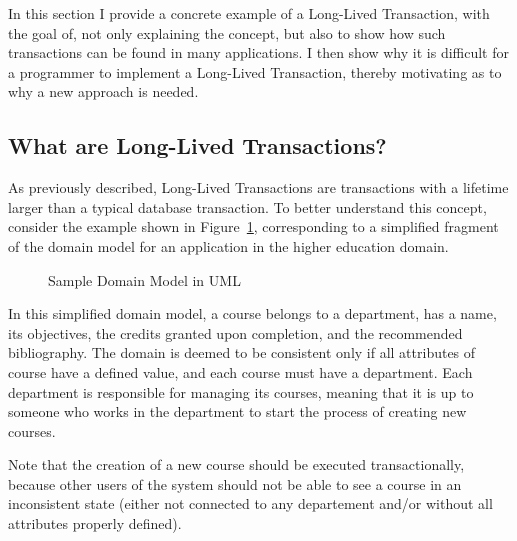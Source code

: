 \documentclass{llncs}
\begin{document}
In this section I provide a concrete example of a Long-Lived
Transaction, with the goal of, not only explaining the concept, but
also to show how such transactions can be found in many
applications. I then show why it is difficult for a programmer to
implement a Long-Lived Transaction, thereby motivating as to why a new
approach is needed.

\subsection{What are Long-Lived Transactions?}
\label{sec:what}

As previously described, Long-Lived Transactions are transactions with
a lifetime larger than a typical database transaction. To better
understand this concept, consider the example shown in
Figure~\ref{fig:courseDomain}, corresponding to a simplified fragment
of the domain model for an application in the higher education domain.

\begin{figure}
  \centering

\caption{Sample Domain Model in UML}
\label{fig:courseDomain}

\end{figure}

In this simplified domain model, a course belongs to a department, has
a name, its objectives, the credits granted upon completion, and the
recommended bibliography. The domain is deemed to be consistent only
if all attributes of course have a defined value, and each course must
have a department. Each department is responsible for managing its
courses, meaning that it is up to someone who works in the department
to start the process of creating new courses.

Note that the creation of a new course should be executed
transactionally, because other users of the system should not be able
to see a course in an inconsistent state (either not connected to any
departement and/or without all attributes properly defined).
\end{document}
